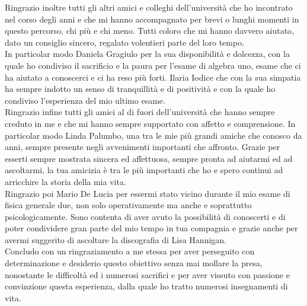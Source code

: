 \documentclass[12pt,a4paper,oneside]{book}
\begin{document}
Ringrazio inoltre tutti gli altri amici e colleghi dell'università che ho incontrato nel corso degli anni e che mi hanno accompagnato per brevi o lunghi momenti in questo percorso, chi più e chi meno. Tutti coloro che mi hanno davvero aiutato, dato un consiglio sincero, regalato volentieri parte del loro tempo.\\
In particolar modo Daniela Gragiulo per la sua disponibilità e dolcezza, con la quale ho condiviso il sacrificio e la paura per l'esame di algebra uno, esame che ci ha aiutato a conoscerci e ci ha reso più forti. Ilaria Iodice che con la sua simpatia ha sempre indotto un senso di tranquillità e di positività e con la quale ho condiviso l'esperienza del mio ultimo esame.\\
Ringrazio infine tutti gli amici al di fuori dell'università che hanno sempre creduto in me e che mi hanno sempre supportato con affetto e comprensione. In particolar modo Linda Palumbo, una tra le mie più grandi amiche che conosco da anni, sempre presente negli avvenimenti importanti che affronto. Grazie per esserti sempre mostrata sincera ed affettuosa, sempre pronta ad aiutarmi ed ad ascoltarmi, la tua amicizia è tra le più importanti che ho e spero continui ad arricchire la storia della mia vita.\\ Ringrazio poi Mario De Lucia per essermi stato vicino durante il mio esame di fisica generale due, non solo operativamente ma anche e soprattutto psicologicamente. Sono contenta di aver avuto la possibilità di conoscerti e di poter condividere gran parte del mio tempo in tua compagnia e grazie anche per avermi suggerito di ascoltare la discografia di Lisa Hannigan.\\
Concludo con un ringraziamento a me stessa per aver perseguito con determinazione e desiderio questo obiettivo senza mai mollare la presa, nonostante le difficoltà ed i numerosi sacrifici e per aver vissuto con passione e convinzione questa esperienza, dalla quale ho tratto numerosi insegnamenti di vita. 


\end{document}
